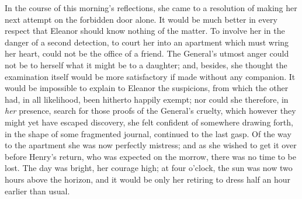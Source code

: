  In the course of this morning's reflections, she came to a resolution of making her next attempt on the forbidden door alone. It would be much better in every respect that Eleanor should know nothing of the matter. To involve her in the danger of a second detection, to court her into an apartment which must wring her heart, could not be the office of a friend. The General's utmost anger could not be to herself what it might be to a daughter; and, besides, she thought the examination itself would be more satisfactory if made without any companion. It would be impossible to explain to Eleanor the suspicions, from which the other had, in all likelihood, been hitherto happily exempt; nor could she therefore, in \textit{her} presence, search for those proofs of the General's cruelty, which however they might yet have escaped discovery, she felt confident of somewhere drawing forth, in the shape of some fragmented journal, continued to the last gasp. Of the way to the apartment she was now perfectly mistress; and as she wished to get it over before Henry's return, who was expected on the morrow, there was no time to be lost. The day was bright, her courage high; at four o'clock, the sun was now two hours above the horizon, and it would be only her retiring to dress half an hour earlier than usual. 

